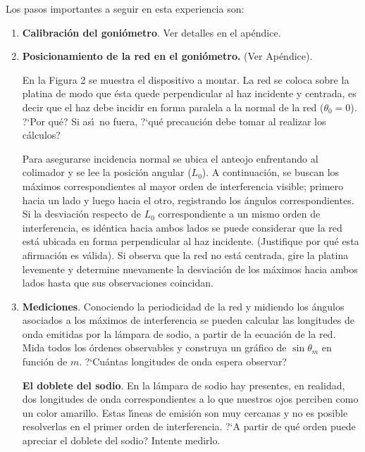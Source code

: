 \documentclass[epj]{svjour}
\begin{document}
Los pasos importantes a seguir en esta experiencia son:

\begin{enumerate}
    \item {\bf Calibraci\'on del goni\'ometro}. Ver detalles en el ap\'endice.
    \item {\bf Posicionamiento de la red en el goni\'ometro.} (Ver Ap\'endice). 

        En la Figura 2 se muestra el dispositivo a montar. La red se coloca 
        sobre la platina de modo que \'esta quede perpendicular al haz 
        incidente y centrada, es decir que el haz debe incidir en forma 
        paralela a la normal de la red ($\theta_0 = 0$). ?`Por qu\'e? Si 
        as\'\i\ no fuera, ?`qu\'e precauci\'on debe tomar al realizar los 
        c\'alculos?

        Para asegurarse incidencia normal se ubica el anteojo enfrentando al 
        colimador y se lee la posici\'on angular ($L_0$). A continuaci\'on, 
        se buscan los m\'aximos correspondientes al mayor orden de 
        interferencia visible; primero hacia un lado y luego hacia el otro,
        registrando los \'angulos correspondientes. Si la desviaci\'on respecto
        de $L_0$ correspondiente a un mismo orden de interferencia, es 
        id\'entica hacia ambos lados se puede considerar que la red est\'a 
        ubicada en forma perpendicular al haz incidente. (Justifique por qu\'e
        esta afirmaci\'on es v\'alida). Si observa que la red no est\'a 
        centrada, gire la platina levemente y determine nuevamente la 
        desviaci\'on de los m\'aximos hacia ambos lados hasta que sus 
        observaciones coincidan.

    \item {\bf Mediciones}. Conociendo la periodicidad de la red y midiendo los
        \'angulos asociados a los  m\'aximos de interferencia se pueden 
        calcular las longitudes de onda emitidas por la l\'ampara de sodio, a
        partir de la ecuaci\'on de la red. Mida todos los \'ordenes observables
        y construya un gr\'afico de $\sin \theta_m$ en funci\'on de $m$. 
        ?`Cu\'antas longitudes de onda espera observar?
        
        {\bf El doblete del sodio}. En la l\'ampara de sodio hay presentes,
        en realidad, dos longitudes 
        de onda correspondientes a lo que nuestros ojos perciben como un 
        color amarillo. Estas l\'\i neas de emisi\'on son muy cercanas y no es
        posible resolverlas en el primer orden de interferencia. 
        ?`A partir de qu\'e orden puede apreciar el doblete del sodio? 
        Intente medirlo.
\end{enumerate}
\end{document}

